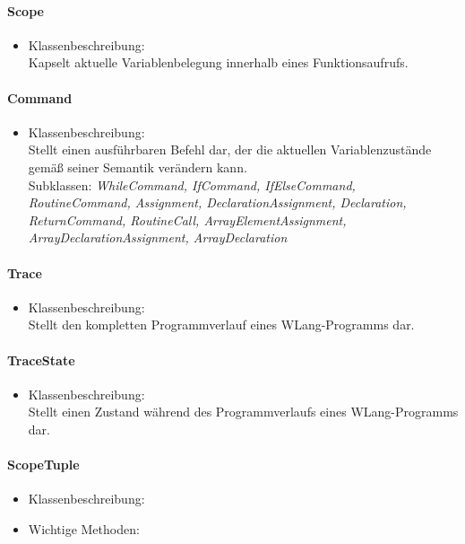 \documentclass[parskip=full]{scrartcl}
\begin{document}
\paragraph{Scope}
\begin{itemize}
\item Klassenbeschreibung: \\
Kapselt aktuelle Variablenbelegung innerhalb eines Funktionsaufrufs.
\end{itemize}
\paragraph{Command}
\begin{itemize}
\item Klassenbeschreibung: \\
Stellt einen ausführbaren Befehl dar, der die aktuellen Variablenzustände gemäß seiner Semantik verändern kann.\\
Subklassen: \textit{WhileCommand, IfCommand, IfElseCommand, RoutineCommand, Assignment, DeclarationAssignment, Declaration, ReturnCommand, RoutineCall, ArrayElementAssignment, ArrayDeclarationAssignment, ArrayDeclaration}
\end{itemize}
\paragraph{Trace}
\begin{itemize}
\item Klassenbeschreibung: \\
Stellt den kompletten Programmverlauf eines WLang-Programms dar.
\end{itemize}
\paragraph{TraceState}
\begin{itemize}
\item Klassenbeschreibung: \\
Stellt einen Zustand während des Programmverlaufs eines WLang-Programms dar.
\end{itemize}
\paragraph{ScopeTuple}
\begin{itemize}
\item Klassenbeschreibung: \\

\item Wichtige Methoden:\\
\end{itemize}
\end{document}
